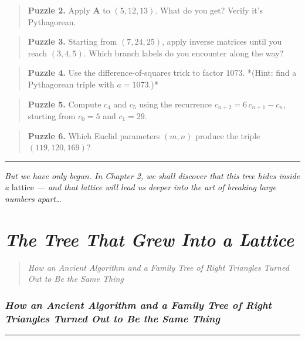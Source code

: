 \documentclass[11pt,openany]{book}
\theoremstyle{definition}
\theoremstyle{plain}
\theoremstyle{remark}
\begin{document}
\begin{quote}
\textbf{Puzzle 2.} Apply $\mathbf{A}$ to $(5, 12, 13)$. What do you get? Verify it's Pythagorean.
\end{quote}


\begin{quote}
\textbf{Puzzle 3.} Starting from $(7, 24, 25)$, apply inverse matrices until you reach $(3, 4, 5)$. Which branch labels do you encounter along the way?
\end{quote}


\begin{quote}
\textbf{Puzzle 4.} Use the difference-of-squares trick to factor $1073$. *(Hint: find a Pythagorean triple with $a = 1073$.)*
\end{quote}


\begin{quote}
\textbf{Puzzle 5.} Compute $c_4$ and $c_5$ using the recurrence $c_{n+2} = 6\,c_{n+1} - c_n$, starting from $c_0 = 5$ and $c_1 = 29$.
\end{quote}


\begin{quote}
\textbf{Puzzle 6.} Which Euclid parameters $(m, n)$ produce the triple $(119, 120, 169)$?
\end{quote}


\bigskip\noindent\rule{\textwidth}{0.4pt}\bigskip


\textit{But we have only begun. In Chapter 2, we shall discover that this tree hides inside a} lattice \textit{— and that lattice will lead us deeper into the art of breaking large numbers apart…}

\clearpage

\chapter{\textit{The Tree That Grew Into a Lattice}}
\begin{quote}\textit{How an Ancient Algorithm and a Family Tree of Right Triangles Turned Out to Be the Same Thing}\end{quote}



\subsection*{\textit{How an Ancient Algorithm and a Family Tree of Right Triangles Turned Out to Be the Same Thing}}


\bigskip\noindent\rule{\textwidth}{0.4pt}\bigskip
\end{document}
